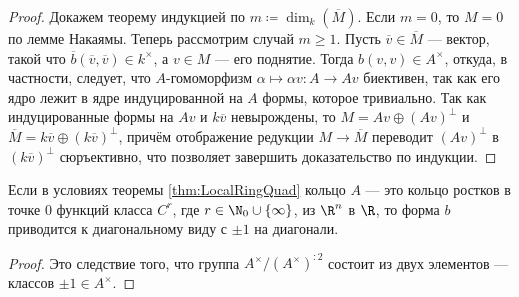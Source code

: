 \documentclass[
	extrafontsizes,
	11pt,
	hyphens,
]{memoir}
\begin{document}
\begin{proof}
Докажем теорему индукцией по \(m \coloneqq \dim_k(\overline{M})\).
Если \(m = 0\), то \(M = 0\) по лемме Накаямы.
Теперь рассмотрим случай \(m \geq 1\).
Пусть \(\overline{v} \in \overline{M}\) --- вектор, такой что \(\overline{b}(\overline{v}, \overline{v}) \in k^\times\), а \(v \in M\) --- его поднятие. Тогда \(b(v, v) \in A^\times\), откуда,
в частности, следует, что \(A\)-го\-мо\-мор\-физм \(\alpha \mapsto \alpha v : A \to Av\) биективен,
так как его ядро лежит в ядре индуцированной на \(A\) формы, которое тривиально.
Так как
индуцированные формы на \(Av\) и \(k \overline{v}\) невырождены, то
\(M = Av \oplus (Av)^\perp\) и \(\overline{M} = k \overline{v} \oplus (k \overline{v})^\perp\), причём отображение редукции \(M \to \overline{M}\) переводит \((Av)^\perp\) в \((k \overline{v})^\perp\) сюръективно, что позволяет завершить доказательство по индукции.
\end{proof}

\begin{corollary}
\label{cor:LocalSmoothRingQuad}
Если в условиях теоремы \ref{thm:LocalRingQuad} кольцо \(A\) --- это кольцо ростков в точке \(0\) функций класса \(C^r\), где \(r \in \N_0 \cup \{\infty\}\), из \(\R^n\) в \(\R\), то форма \(b\)
приводится к диагональному виду с \(\pm 1\) на диагонали.
\end{corollary}

\begin{proof}
Это следствие
того, что
группа \(A^\times / (A^\times)^{:2}\) состоит из двух элементов --- классов \(\pm 1 \in A^\times\).
\end{proof}
\end{document}
